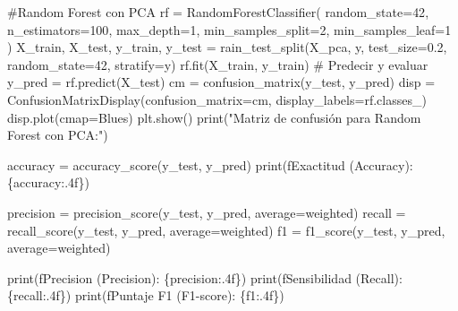 \documentclass[
  letterpaper,
  DIV=11,
  numbers=noendperiod]{scrartcl}
\newenvironment{Shaded}{\begin{snugshade}}{\end{snugshade}}
\newcommand{\BuiltInTok}[1]{\textcolor[rgb]{0.00,0.23,0.31}{#1}}
\newcommand{\CommentTok}[1]{\textcolor[rgb]{0.37,0.37,0.37}{#1}}
\newcommand{\DecValTok}[1]{\textcolor[rgb]{0.68,0.00,0.00}{#1}}
\newcommand{\FloatTok}[1]{\textcolor[rgb]{0.68,0.00,0.00}{#1}}
\newcommand{\NormalTok}[1]{\textcolor[rgb]{0.00,0.23,0.31}{#1}}
\newcommand{\OperatorTok}[1]{\textcolor[rgb]{0.37,0.37,0.37}{#1}}
\newcommand{\SpecialCharTok}[1]{\textcolor[rgb]{0.37,0.37,0.37}{#1}}
\newcommand{\SpecialStringTok}[1]{\textcolor[rgb]{0.13,0.47,0.30}{#1}}
\newcommand{\StringTok}[1]{\textcolor[rgb]{0.13,0.47,0.30}{#1}}
\begin{document}
\begin{Shaded}
\begin{Highlighting}[]
\CommentTok{\#Random Forest con PCA}
\NormalTok{rf }\OperatorTok{=}\NormalTok{ RandomForestClassifier(}
\NormalTok{  random\_state}\OperatorTok{=}\DecValTok{42}\NormalTok{,}
\NormalTok{  n\_estimators}\OperatorTok{=}\DecValTok{100}\NormalTok{,}
\NormalTok{  max\_depth}\OperatorTok{=}\DecValTok{1}\NormalTok{,}
\NormalTok{  min\_samples\_split}\OperatorTok{=}\DecValTok{2}\NormalTok{,}
\NormalTok{  min\_samples\_leaf}\OperatorTok{=}\DecValTok{1}
\NormalTok{)}
\NormalTok{X\_train, X\_test, y\_train, y\_test }\OperatorTok{=} 
\NormalTok{  rain\_test\_split(X\_pca, y, test\_size}\OperatorTok{=}\FloatTok{0.2}\NormalTok{, random\_state}\OperatorTok{=}\DecValTok{42}\NormalTok{, stratify}\OperatorTok{=}\NormalTok{y)}
\NormalTok{rf.fit(X\_train, y\_train)}
\CommentTok{\# Predecir y evaluar}
\NormalTok{y\_pred }\OperatorTok{=}\NormalTok{ rf.predict(X\_test)}
\NormalTok{cm }\OperatorTok{=}\NormalTok{ confusion\_matrix(y\_test, y\_pred)}
\NormalTok{disp }\OperatorTok{=}\NormalTok{ ConfusionMatrixDisplay(confusion\_matrix}\OperatorTok{=}\NormalTok{cm, display\_labels}\OperatorTok{=}\NormalTok{rf.classes\_)}
\NormalTok{disp.plot(cmap}\OperatorTok{=}\StringTok{\textquotesingle{}Blues\textquotesingle{}}\NormalTok{)}
\NormalTok{plt.show()}
\BuiltInTok{print}\NormalTok{(}\StringTok{"Matriz de confusión para Random Forest con PCA:"}\NormalTok{)}

\NormalTok{accuracy }\OperatorTok{=}\NormalTok{ accuracy\_score(y\_test, y\_pred)}
\BuiltInTok{print}\NormalTok{(}\SpecialStringTok{f\textquotesingle{}Exactitud (Accuracy): }\SpecialCharTok{\{}\NormalTok{accuracy}\SpecialCharTok{:.4f\}}\SpecialStringTok{\textquotesingle{}}\NormalTok{)}

\NormalTok{precision }\OperatorTok{=}\NormalTok{ precision\_score(y\_test, y\_pred, average}\OperatorTok{=}\StringTok{\textquotesingle{}weighted\textquotesingle{}}\NormalTok{)}
\NormalTok{recall }\OperatorTok{=}\NormalTok{ recall\_score(y\_test, y\_pred, average}\OperatorTok{=}\StringTok{\textquotesingle{}weighted\textquotesingle{}}\NormalTok{)}
\NormalTok{f1 }\OperatorTok{=}\NormalTok{ f1\_score(y\_test, y\_pred, average}\OperatorTok{=}\StringTok{\textquotesingle{}weighted\textquotesingle{}}\NormalTok{)}

\BuiltInTok{print}\NormalTok{(}\SpecialStringTok{f\textquotesingle{}Precision (Precision): }\SpecialCharTok{\{}\NormalTok{precision}\SpecialCharTok{:.4f\}}\SpecialStringTok{\textquotesingle{}}\NormalTok{)}
\BuiltInTok{print}\NormalTok{(}\SpecialStringTok{f\textquotesingle{}Sensibilidad (Recall): }\SpecialCharTok{\{}\NormalTok{recall}\SpecialCharTok{:.4f\}}\SpecialStringTok{\textquotesingle{}}\NormalTok{)}
\BuiltInTok{print}\NormalTok{(}\SpecialStringTok{f\textquotesingle{}Puntaje F1 (F1{-}score): }\SpecialCharTok{\{}\NormalTok{f1}\SpecialCharTok{:.4f\}}\SpecialStringTok{\textquotesingle{}}\NormalTok{)}
\end{Highlighting}
\end{Shaded}
\end{document}
